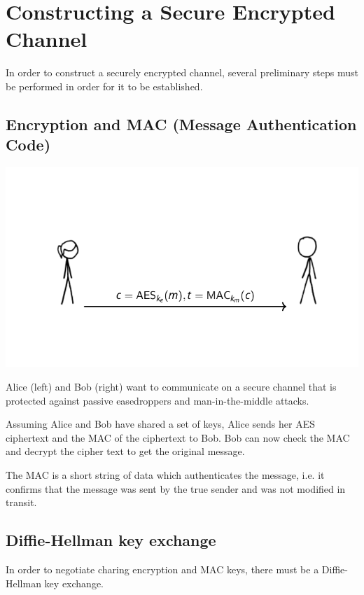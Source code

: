 \documentclass[11pt]{article} %
\begin{document}
\section{Constructing a Secure Encrypted Channel}
In order to construct a securely encrypted channel, several preliminary
steps must be performed in order for it to be established.

\subsection{Encryption and MAC (Message Authentication Code)}

\begin{center}
	\includegraphics[scale=.7]{./tls1.png}
\end{center}

{\parindent0pt Alice (left) and Bob (right) want to communicate on a secure 
channel that is protected against passive easedroppers and man-in-the-middle
attacks.}

\bigskip
{\parindent0pt Assuming Alice and Bob have shared a set of keys, Alice sends her
AES ciphertext and the MAC of the ciphertext to Bob.  Bob can now check the MAC
and decrypt the cipher text to get the original message.}

\bigskip
{\parindent0pt The MAC is a short string of data which authenticates the message, i.e. it
confirms that the message was sent by the true sender and was not modified in transit.}

\newpage
\subsection{Diffie-Hellman key exchange}
In order to negotiate charing encryption and MAC keys, there must be a
Diffie-Hellman key exchange.
\end{document}
